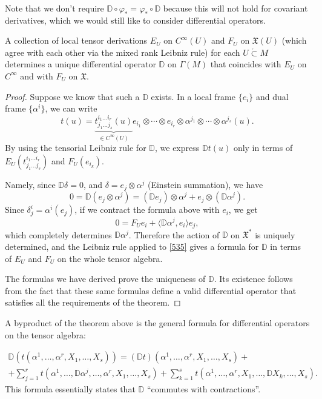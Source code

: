 \documentclass[english,letterpaper]{article}%
\numberwithin{equation}{section}
\numberwithin{figure}{section}
\numberwithin{table}{section}
\theoremstyle{definition}
\theoremstyle{definition}
\theoremstyle{definition}
\theoremstyle{plain}
\theoremstyle{plain}
\theoremstyle{plain}
\theoremstyle{plain}
\theoremstyle{remark}
\theoremstyle{remark}
\newcommand{\fX}{\mathfrak{X}}
\begin{document}
Note that we don't require $\mathbb{D}\circ\varphi_\ast=\varphi_\ast\circ \mathbb{D}$ because this will not hold for covariant derivatives, which we would still like to consider differential operators.

\begin{thm}[Willmore]\label{Willmore}
A collection of local tensor derivations $E_U$ on $C^\infty(U)$ and $F_U$ on $\fX(U)$ (which agree with each other via the mixed rank Leibniz rule) for each $U\mathring{\subset}M$ determines a unique differential operator $\mathbb{D}$ on $\Gamma(M)$ that coincides with $E_U$ on $C^\infty$ and with $F_U$ on $\fX$.
\end{thm}
\begin{proof}
    Suppose we know that such a $\mathbb{D}$ exists. In a local frame $\{e_i\}$ and dual frame $\{\alpha^i\}$, we can write
    \[t(u)=\underbrace{t_{j_1\ldots j_s}^{i_1\ldots i_r}(u)}_{\in C^\infty(U)} e_{i_1}\otimes \cdots \otimes e_{i_r}\otimes \alpha^{j_1}\otimes \cdots\otimes \alpha^{j_s}(u).\]
    By using the tensorial Leibniz rule for $\mathbb{D}$, we express $\mathbb{D}t(u)$ only in terms of $E_U(t_{j_1\ldots j_s}^{i_1\ldots i_r})$ and $F_U(e_{i_k})$.
    
    Namely, since $\mathbb{D}\delta=0$, and $\delta=e_j\otimes \alpha^j$ (Einstein summation), we have 
    \[0=\mathbb{D}(e_j\otimes \alpha^j)=(\mathbb{D}e_j)\otimes \alpha^j+e_j\otimes (\mathbb{D}\alpha^j).\label{535}\]
    Since $\delta^i_j=\alpha^i(e_j)$, if we contract the formula above with $e_i$, we get
    \[0=F_U e_i+\langle \mathbb{D}\alpha^j, e_i\rangle e_j,\]
    which completely determines $\mathbb{D}\alpha^j$. Therefore the action of $\mathbb{D}$ on $\fX^\ast$ is uniquely determined, and the Leibniz rule applied to \ref{535} gives a formula for $\mathbb{D}$ in terms of $E_U$ and $F_U$ on the whole tensor algebra.
    
    The formulas we have derived prove the uniqueness of $\mathbb{D}$. Its existence follows from the fact that these same formulas define a valid differential operator that satisfies all the requirements of the theorem.
\end{proof}
\begin{cor}
A byproduct of the theorem above is the general formula for differential operators on the tensor algebra:

\begin{multline}
    \mathbb{D}\left(t(\alpha^1,\ldots,\alpha^r,X_1,\ldots,X_s)\right)=(\mathbb{D}t)(\alpha^1,\ldots,\alpha^r,X_1,\ldots,X_s)+\\+\sum_{j=1}^r t\left(\alpha^1,\ldots,\mathbb{D}\alpha^j,\ldots,\alpha^r,X_1,\ldots,X_s\right)+\sum_{k=1}^s t\left(\alpha^1,\ldots,\alpha^r,X_1,\ldots,\mathbb{D}X_k,\ldots,X_s\right).
\end{multline}
This formula essentially states that $\mathbb{D}$ ``commutes with contractions''.
\end{cor}
\end{document}

